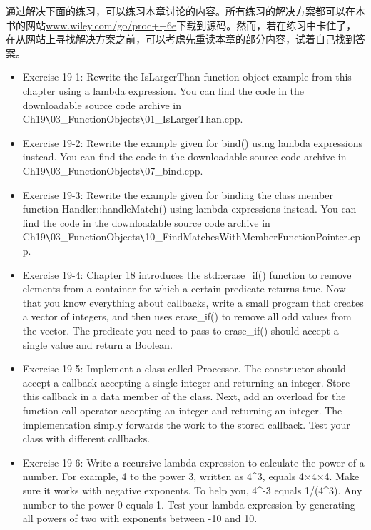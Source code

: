 通过解决下面的练习，可以练习本章讨论的内容。所有练习的解决方案都可以在本书的网站\url{www.wiley.com/go/proc++6e}下载到源码。然而，若在练习中卡住了，在从网站上寻找解决方案之前，可以考虑先重读本章的部分内容，试着自己找到答案。

\begin{itemize}
\item
Exercise 19-1: Rewrite the IsLargerThan function object example from this chapter using a lambda expression. You can find the code in the downloadable source code archive in Ch19\verb|\|03\_FunctionObjects\verb|\|01\_IsLargerThan.cpp.

\item
Exercise 19-2: Rewrite the example given for bind() using lambda expressions instead. You can find the code in the downloadable source code archive in Ch19\verb|\|03\_FunctionObjects\verb|\|07\_bind.cpp.

\item
Exercise 19-3: Rewrite the example given for binding the class member function Handler::handleMatch() using lambda expressions instead. You can find the code in the downloadable source code archive in Ch19\verb|\|03\_FunctionObjects\verb|\|10\_FindMatchesWithMemberFunctionPointer.cpp.

\item
Exercise 19-4: Chapter 18 introduces the std::erase\_if() function to remove elements from a container for which a certain predicate returns true. Now that you know everything about callbacks, write a small program that creates a vector of integers, and then uses erase\_if() to remove all odd values from the vector. The predicate you need to pass to erase\_if() should accept a single value and return a Boolean.

\item
Exercise 19-5: Implement a class called Processor. The constructor should accept a callback accepting a single integer and returning an integer. Store this callback in a data member of the class. Next, add an overload for the function call operator accepting an integer and returning an integer. The implementation simply forwards the work to the stored callback. Test your class with different callbacks.

\item
Exercise 19-6: Write a recursive lambda expression to calculate the power of a number. For example, 4 to the power 3, written as 4\^{}3, equals 4×4×4. Make sure it works with negative exponents. To help you, 4\^{}-3 equals 1/(4\^{}3). Any number to the power 0 equals 1. Test your lambda expression by generating all powers of two with exponents between -10 and 10.
\end{itemize}
